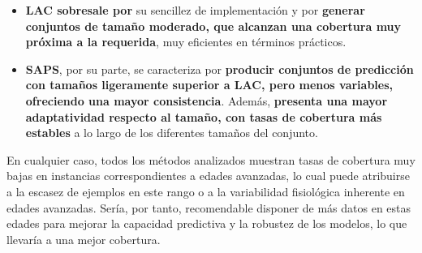 \begin{itemize}

    \item \textbf{LAC sobresale por} su sencillez de implementación y por \textbf{generar conjuntos de tamaño moderado, que alcanzan una cobertura muy próxima a la requerida}, muy eficientes en términos prácticos.
    
    \item \textbf{SAPS}, por su parte, se caracteriza por \textbf{producir conjuntos de predicción con tamaños ligeramente superior a LAC, pero menos variables, ofreciendo una mayor consistencia}. Además, \textbf{presenta una mayor adaptatividad respecto al tamaño, con tasas de cobertura más estables} a lo largo de los diferentes tamaños del conjunto. 
    
\end{itemize}

En cualquier caso, todos los métodos analizados muestran tasas de cobertura muy bajas en instancias correspondientes a edades avanzadas, lo cual puede atribuirse a la escasez de ejemplos en este rango o a la variabilidad fisiológica inherente en edades avanzadas. Sería, por tanto, recomendable disponer de más datos en estas edades para mejorar la capacidad predictiva y la robustez de los modelos, lo que llevaría a una mejor cobertura.







